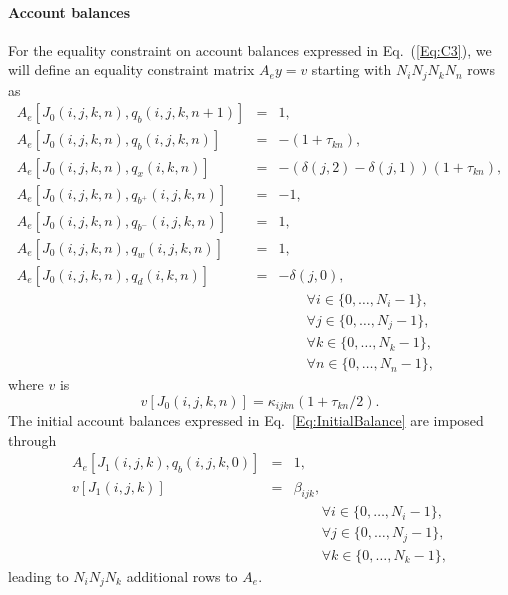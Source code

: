 \documentclass{article}[fleqn,12pt]
\begin{document}
\paragraph*{Account balances}
For the equality constraint on account balances expressed in Eq.~(\ref{Eq:C3}),
we will define an equality constraint matrix $A_ey = v$ starting
with $N_iN_jN_kN_n$ rows as
\begin{eqnarray}
	\label{Eq:B1}
	A_e[J_0(i, j, k, n), q_b(i, j, k, n+1)] &=& 1, \nonumber \\
	A_e[J_0(i, j, k, n), q_b(i, j, k, n)] &=& -(1 + \tau_{kn}), \nonumber \\
	A_e[J_0(i, j, k, n), q_x(i, k, n)] &=& -(\delta(j, 2) - \delta(j, 1))(1 + \tau_{kn}), \nonumber \\
	A_e[J_0(i, j, k, n), q_{b^+}(i, j, k, n)] &=& -1, \nonumber \\
	A_e[J_0(i, j, k, n), q_{b^-}(i, j, k, n)] &=&  1, \nonumber \\
	A_e[J_0(i, j, k, n), q_w(i, j, k, n)] &=& 1, \nonumber \\
	A_e[J_0(i, j, k, n), q_d(i, k, n)] &=& -\delta(j, 0), \\
	&&\qquad\forall i \in \{0,\ldots, N_i-1\},\nonumber\\
	&&\qquad\forall j \in \{0,\ldots, N_j-1\},\nonumber\\
	&&\qquad\forall k \in \{0,\ldots, N_k-1\},\nonumber\\
	&&\qquad\forall n \in \{0,\ldots, N_n-1\}, \nonumber
\end{eqnarray}
where $v$ is
\begin{equation}
	v[J_0(i, j, k, n)] = \kappa_{ijkn}(1 + \tau_{kn}/2).
\end{equation}
The initial account balances expressed in Eq.~\ref{Eq:InitialBalance} are imposed through
\begin{eqnarray}
	A_e[J_1(i, j, k), q_b(i, j, k, 0)] &=& 1, \nonumber \\
	v[J_1(i, j, k)] &=& \beta_{ijk},  \\
	&&\qquad\forall i \in \{0,\ldots, N_i-1\},\nonumber\\
	&&\qquad\forall j \in \{0,\ldots, N_j-1\},\nonumber\\
	&&\qquad\forall k \in \{0,\ldots, N_k-1\},\nonumber
\end{eqnarray}
leading to $N_i N_j N_k$ additional rows to $A_e$.
\end{document}
